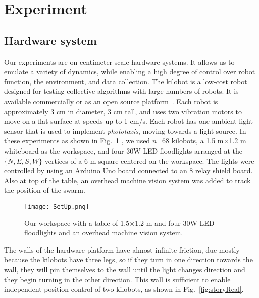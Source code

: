 
\section{Experiment}\label{sec:expResults}



\subsection{Hardware system}


Our experiments are on centimeter-scale hardware systems.  It allows us to emulate a variety of dynamics, while enabling a high degree of control over robot function, the environment, and data collection. The kilobot \cite{Rubenstein2012,rubenstein2014programmable} is a low-cost robot designed for testing collective algorithms with large numbers of robots. It is available commercially or as an open source platform~\cite{K-Team2015}.  Each robot is approximately 3 cm in diameter, 3 cm tall, and uses two vibration motors to move on a flat surface at speeds up to 1 cm/s.  Each robot has one ambient light sensor that is used to implement \emph{phototaxis},  moving towards a light source. 
In these experiments as shown in Fig.~\ref{fig:setup} , we used $n$=68 kilobots, a 1.5 m$\times$1.2 m whiteboard as the workspace, and four 30W LED floodlights arranged at the $\{N,E,S,W\}$ vertices of a 6 m square centered on the workspace. The lights were controlled by using an Arduino Uno board connected to an 8 relay shield board. Also at top of the table, an overhead machine vision system was added to track the position of the swarm.

\begin{figure}
\begin{center}
	\texttt{[image: SetUp.png]}
\end{center}
\caption{\label{fig:setup}
Our workspace with a table of 1.5$\times$1.2 m and four 30W LED floodlights and an overhead machine vision system.
}
\end{figure}

The walls of the hardware platform have almost infinite friction, due mostly because the kilobots have three legs, so if they turn in one direction towards the wall, they will pin themselves to the wall until the light changes direction and they begin turning in the other direction.  This wall is sufficient to enable independent position control of two kilobots, as shown in Fig.~\ref{fig:storyReal}.



